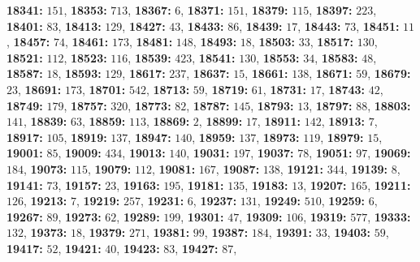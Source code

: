 \textsf{\bfseries 18341:} $151$, \textsf{\bfseries 18353:} $713$, \textsf{\bfseries 18367:} $6$, \textsf{\bfseries 18371:} $151$, \textsf{\bfseries 18379:} $115$, \textsf{\bfseries 18397:} $223$, \textsf{\bfseries 18401:} $83$, \textsf{\bfseries 18413:} $129$, \textsf{\bfseries 18427:} $43$, \textsf{\bfseries 18433:} $86$, \textsf{\bfseries 18439:} $17$, \textsf{\bfseries 18443:} $73$, \textsf{\bfseries 18451:} $11$, \textsf{\bfseries 18457:} $74$, \textsf{\bfseries 18461:} $173$, \textsf{\bfseries 18481:} $148$, \textsf{\bfseries 18493:} $18$, \textsf{\bfseries 18503:} $33$, \textsf{\bfseries 18517:} $130$, \textsf{\bfseries 18521:} $112$, \textsf{\bfseries 18523:} $116$, \textsf{\bfseries 18539:} $423$, \textsf{\bfseries 18541:} $130$, \textsf{\bfseries 18553:} $34$, \textsf{\bfseries 18583:} $48$, \textsf{\bfseries 18587:} $18$, \textsf{\bfseries 18593:} $129$, \textsf{\bfseries 18617:} $237$, \textsf{\bfseries 18637:} $15$, \textsf{\bfseries 18661:} $138$, \textsf{\bfseries 18671:} $59$, \textsf{\bfseries 18679:} $23$, \textsf{\bfseries 18691:} $173$, \textsf{\bfseries 18701:} $542$, \textsf{\bfseries 18713:} $59$, \textsf{\bfseries 18719:} $61$, \textsf{\bfseries 18731:} $17$, \textsf{\bfseries 18743:} $42$, \textsf{\bfseries 18749:} $179$, \textsf{\bfseries 18757:} $320$, \textsf{\bfseries 18773:} $82$, \textsf{\bfseries 18787:} $145$, \textsf{\bfseries 18793:} $13$, \textsf{\bfseries 18797:} $88$, \textsf{\bfseries 18803:} $141$, \textsf{\bfseries 18839:} $63$, \textsf{\bfseries 18859:} $113$, \textsf{\bfseries 18869:} $2$, \textsf{\bfseries 18899:} $17$, \textsf{\bfseries 18911:} $142$, \textsf{\bfseries 18913:} $7$, \textsf{\bfseries 18917:} $105$, \textsf{\bfseries 18919:} $137$, \textsf{\bfseries 18947:} $140$, \textsf{\bfseries 18959:} $137$, \textsf{\bfseries 18973:} $119$, \textsf{\bfseries 18979:} $15$, \textsf{\bfseries 19001:} $85$, \textsf{\bfseries 19009:} $434$, \textsf{\bfseries 19013:} $140$, \textsf{\bfseries 19031:} $197$, \textsf{\bfseries 19037:} $78$, \textsf{\bfseries 19051:} $97$, \textsf{\bfseries 19069:} $184$, \textsf{\bfseries 19073:} $115$, \textsf{\bfseries 19079:} $112$, \textsf{\bfseries 19081:} $167$, \textsf{\bfseries 19087:} $138$, \textsf{\bfseries 19121:} $344$, \textsf{\bfseries 19139:} $8$, \textsf{\bfseries 19141:} $73$, \textsf{\bfseries 19157:} $23$, \textsf{\bfseries 19163:} $195$, \textsf{\bfseries 19181:} $135$, \textsf{\bfseries 19183:} $13$, \textsf{\bfseries 19207:} $165$, \textsf{\bfseries 19211:} $126$, \textsf{\bfseries 19213:} $7$, \textsf{\bfseries 19219:} $257$, \textsf{\bfseries 19231:} $6$, \textsf{\bfseries 19237:} $131$, \textsf{\bfseries 19249:} $510$, \textsf{\bfseries 19259:} $6$, \textsf{\bfseries 19267:} $89$, \textsf{\bfseries 19273:} $62$, \textsf{\bfseries 19289:} $199$, \textsf{\bfseries 19301:} $47$, \textsf{\bfseries 19309:} $106$, \textsf{\bfseries 19319:} $577$, \textsf{\bfseries 19333:} $132$, \textsf{\bfseries 19373:} $18$, \textsf{\bfseries 19379:} $271$, \textsf{\bfseries 19381:} $99$, \textsf{\bfseries 19387:} $184$, \textsf{\bfseries 19391:} $33$, \textsf{\bfseries 19403:} $59$, \textsf{\bfseries 19417:} $52$, \textsf{\bfseries 19421:} $40$, \textsf{\bfseries 19423:} $83$, \textsf{\bfseries 19427:} $87$, 
